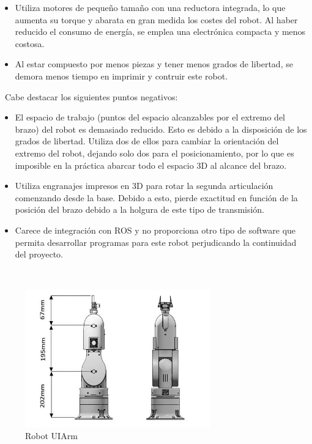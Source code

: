 \begin{itemize}
\begin{itemize}
        \item Utiliza motores de pequeño tamaño con una reductora integrada, lo que aumenta su torque y abarata en gran medida los costes 
        del robot. Al haber reducido el consumo de energía, se emplea una electrónica compacta y menos costosa.
        \item Al estar compuesto por menos piezas y tener menos grados de libertad, se demora menos tiempo en imprimir y contruir este robot.
    \end{itemize}\
    Cabe destacar los siguientes puntos negativos:
    \begin{itemize}
        \item El espacio de trabajo (puntos del espacio alcanzables por el extremo del brazo) del robot es demasiado reducido. Esto es debido 
        a la disposición de los grados de libertad. Utiliza dos de ellos para cambiar la orientación del extremo del robot, dejando solo dos para el 
        posicionamiento, por lo que es imposible en la práctica abarcar todo el espacio 3D al alcance del brazo.
        \item Utiliza engranajes impresos en 3D para rotar la segunda articulación comenzando desde la base. Debido a esto, pierde exactitud en función 
        de la posición del brazo debido a la holgura de este tipo de transmisión.
        \item Carece de integración con \ac{ROS} y no proporciona otro tipo de software que permita desarrollar programas para este robot perjudicando la 
        continuidad del proyecto.
    \end{itemize}\
    \begin{figure} [h!]
        \begin{center}
          \includegraphics[width=8cm]{figs/uiarm.png}
        \end{center}
        \caption{Robot UIArm}
        \label{fig:uiarm}
    \end{figure}\ 
    \newpage

\end{itemize}
